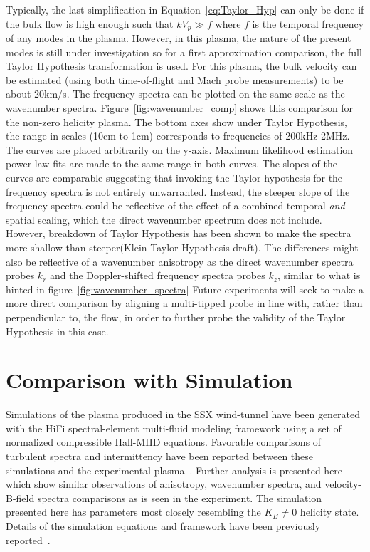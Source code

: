 \documentclass[aip,prl,amsmath,amssymb,reprint,superscriptaddress]{revtex4-1} %
\begin{document}
Typically, the last simplification in Equation~\ref{eq:Taylor_Hyp} can only be done if the bulk flow is high enough such that $kV_{p} \gg f$ where $f$ is the temporal frequency of any modes in the plasma. However, in this plasma, the nature of the present modes is still under investigation so for a first approximation comparison, the full Taylor Hypothesis transformation is used. For this plasma, the bulk velocity can be estimated (using both time-of-flight and Mach probe measurements) to be about 20km/s. The frequency spectra can be plotted on the same scale as the wavenumber spectra. Figure~\ref{fig:wavenumber_comp} shows this comparison for the non-zero helicity plasma. The bottom axes show under Taylor Hypothesis, the range in scales (10cm to 1cm) corresponds to frequencies of 200kHz-2MHz. The curves are placed arbitrarily on the y-axis. Maximum likelihood estimation power-law fits are made to the same range in both curves. The slopes of the curves are comparable suggesting that invoking the Taylor hypothesis for the frequency spectra is not entirely unwarranted. Instead, the steeper slope of the frequency spectra could be reflective of the effect of a combined temporal {\it and} spatial scaling, which the direct wavenumber spectrum does not include. However, breakdown of Taylor Hypothesis has been shown to make the spectra more shallow than steeper(Klein Taylor Hypothesis draft). The differences might also be reflective of a wavenumber anisotropy as the direct wavenumber spectra probes $k_{r}$ and the Doppler-shifted frequency spectra probes $k_{z}$, similar to what is hinted in figure~\ref{fig:wavenumber_spectra} Future experiments will seek to make a more direct comparison by aligning a multi-tipped probe in line with, rather than perpendicular to, the flow, in order to further probe the validity of the Taylor Hypothesis in this case.

\section{Comparison with Simulation}\label{sec:simulation}

Simulations of the plasma produced in the SSX wind-tunnel have been generated with the HiFi spectral-element multi-fluid modeling framework using a set of normalized compressible Hall-MHD equations. Favorable comparisons of turbulent spectra and intermittency have been reported between these simulations and the experimental plasma~\cite{schaffner14a}. Further analysis is presented here which show similar observations of anisotropy, wavenumber spectra, and velocity-B-field spectra comparisons as is seen in the experiment. The simulation presented here has parameters most closely resembling the $K_{B}\neq 0$ helicity state. Details of the simulation equations and framework have been previously reported~\cite{schaffner14a}.
\end{document}
